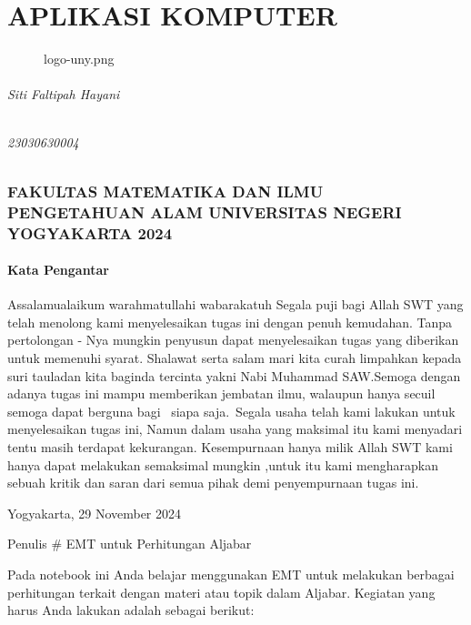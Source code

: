 \documentclass[
]{book}
\author{}
\date{}
\makeatletter
\newcommand*\pandocbounded[1]{%
  \sbox\pandoc@box{#1}%
  \Gscale@div\@tempa{\textheight}{\dimexpr\ht\pandoc@box+\dp\pandoc@box\relax}%
  \Gscale@div\@tempb{\linewidth}{\wd\pandoc@box}%
  \ifdim\@tempb\p@<\@tempa\p@\let\@tempa\@tempb\fi%
  \ifdim\@tempa\p@<\p@\scalebox{\@tempa}{\usebox\pandoc@box}%
  \else\usebox{\pandoc@box}%
  \fi%
}
\makeatother
\begin{document}
\frontmatter

\mainmatter
\chapter{APLIKASI KOMPUTER}\label{aplikasi-komputer}

\begin{figure}
\centering
\pandocbounded{\texttt{[image: ./logo-uny.png]}}
\caption{logo-uny.png}
\end{figure}

\subparagraph{Siti Faltipah Hayani}\label{siti-faltipah-hayani}

\subparagraph{23030630004}\label{section}

\subsection{FAKULTAS MATEMATIKA DAN ILMU PENGETAHUAN ALAM UNIVERSITAS NEGERI YOGYAKARTA 2024}\label{fakultas-matematika-dan-ilmu-pengetahuan-alam-universitas-negeri-yogyakarta-2024}

\subsubsection{Kata Pengantar}\label{kata-pengantar}

Assalamualaikum warahmatullahi wabarakatuh Segala puji bagi Allah SWT yang telah menolong kami menyelesaikan tugas ini dengan penuh kemudahan. Tanpa pertolongan - Nya mungkin penyusun dapat menyelesaikan tugas yang diberikan untuk memenuhi syarat. Shalawat serta salam mari kita curah limpahkan kepada suri tauladan kita baginda tercinta yakni Nabi Muhammad SAW.Semoga dengan adanya tugas ini mampu memberikan jembatan ilmu, walaupun hanya secuil semoga dapat berguna bagi~ siapa saja.~Segala usaha telah kami lakukan untuk menyelesaikan tugas ini, Namun dalam usaha yang maksimal itu kami menyadari tentu masih terdapat kekurangan. Kesempurnaan hanya milik Allah SWT kami hanya dapat melakukan semaksimal mungkin ,untuk itu kami mengharapkan sebuah kritik dan saran dari semua pihak demi penyempurnaan tugas ini.

Yogyakarta, 29 November 2024

Penulis \# EMT untuk Perhitungan Aljabar

Pada notebook ini Anda belajar menggunakan EMT untuk melakukan berbagai perhitungan terkait dengan materi atau topik dalam Aljabar. Kegiatan yang harus Anda lakukan adalah sebagai berikut:
\end{document}
